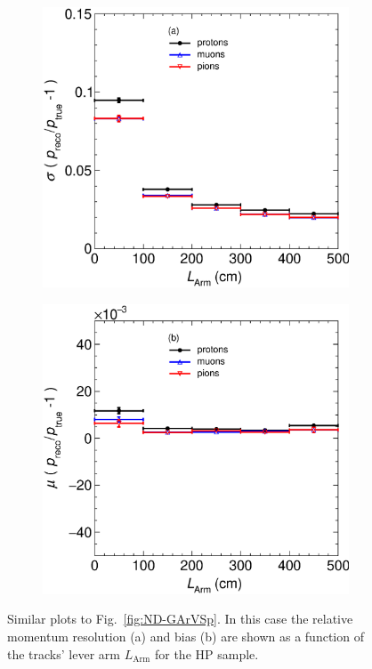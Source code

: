 \begin{figure}[t]
     \centering
     \begin{subfigure}[b]{0.37\textwidth}
         \centering
         \includegraphics[width=\textwidth]{figures/Appendix/RespVSLArm_XL.eps}
         \caption{}
         \label{fig:ResND-GArVSLArm}
     \end{subfigure}
     \begin{subfigure}[b]{0.37\textwidth}
         \centering
         \includegraphics[width=\textwidth]{figures/Appendix/BiaspVSLArm_XL.eps}
         \caption{}
         \label{fig:BiasND-GArVSLArm}
     \end{subfigure}
        \caption{Similar plots to Fig.~\ref{fig:ND-GArVSp}. In this case the relative momentum resolution (a) and bias (b) are shown as a function of the tracks' lever arm $L_\textrm{Arm}$ for the HP sample. }
        \label{fig:ND-GArVSLArm}
\end{figure}

